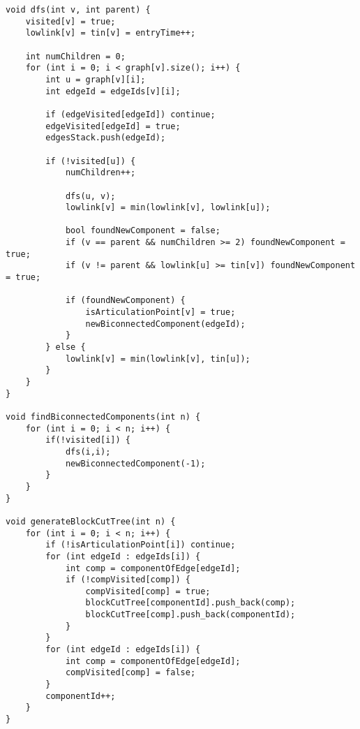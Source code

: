 \documentclass[landscape,twocolumn,10pt,a4paper]{article}
\begin{document}
\begin{verbatim}
void dfs(int v, int parent) {
    visited[v] = true;
    lowlink[v] = tin[v] = entryTime++;

    int numChildren = 0;
    for (int i = 0; i < graph[v].size(); i++) {
        int u = graph[v][i];
        int edgeId = edgeIds[v][i];

        if (edgeVisited[edgeId]) continue;
        edgeVisited[edgeId] = true;
        edgesStack.push(edgeId);

        if (!visited[u]) {
            numChildren++;

            dfs(u, v);
            lowlink[v] = min(lowlink[v], lowlink[u]);

            bool foundNewComponent = false;
            if (v == parent && numChildren >= 2) foundNewComponent = true;
            if (v != parent && lowlink[u] >= tin[v]) foundNewComponent = true;

            if (foundNewComponent) {
                isArticulationPoint[v] = true;
                newBiconnectedComponent(edgeId);
            }
        } else {
            lowlink[v] = min(lowlink[v], tin[u]);
        }
    }
}

void findBiconnectedComponents(int n) {
    for (int i = 0; i < n; i++) {
        if(!visited[i]) {
            dfs(i,i);
            newBiconnectedComponent(-1);
        }
    }
}

void generateBlockCutTree(int n) {
    for (int i = 0; i < n; i++) {
        if (!isArticulationPoint[i]) continue;
        for (int edgeId : edgeIds[i]) {
            int comp = componentOfEdge[edgeId];
            if (!compVisited[comp]) {
                compVisited[comp] = true;
                blockCutTree[componentId].push_back(comp);
                blockCutTree[comp].push_back(componentId);
            }
        }
        for (int edgeId : edgeIds[i]) {
            int comp = componentOfEdge[edgeId];
            compVisited[comp] = false;
        }
        componentId++;
    }
}


\end{verbatim}
\end{document}
